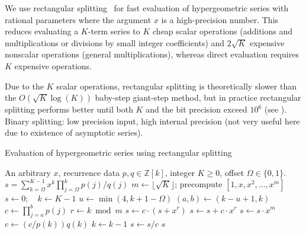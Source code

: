 \documentclass[11pt,a4paper]{article}
\begin{document}
\label{sec:serieseval}

We use rectangular splitting~\cite{Smith1989,Johansson2014rectangular}
for fast evaluation of hypergeometric series with
rational parameters where the argument $x$ is a high-precision number.
This reduces evaluating a $K$-term series to
$K$ cheap scalar operations (additions and multiplications or divisions
by small integer coefficients)
and $2\sqrt{K}$ expensive nonscalar operations (general multiplications),
whereas direct evaluation requires $K$ expensive operations.

Due to the $K$ scalar operations,
rectangular splitting is theoretically slower
than the $O(\sqrt{K} \log(K))$ baby-step giant-step method,
but in practice rectangular splitting
performs better until both $K$ and the bit precision
exceed $10^6$ (see \cite{Johansson2014rectangular}).
Binary splitting: low precision input, high internal precision
(not very useful here due to existence of asymptotic series).

\begin{algorithm}[h!]
  \caption{Evaluation of hypergeometric series using rectangular splitting}
  \small
  \label{alg:hyprs}
  \begin{algorithmic}[1]
    \Require An arbitrary $x$, recurrence data $p, q \in \mathbb{Z}[k]$, integer $K \ge 0$, offset $\Omega \in \{0,1\}$.
    \Ensure $s = \sum_{k=\Omega}^{K-1} x^k \prod_{j=\Omega}^k p(j) / q(j)$
    \State $m \gets \lfloor \sqrt K \rfloor$; precompute $[1, x, x^2, \ldots, x^m]$ 
    \State $s \gets 0; \quad k \gets K - 1$
        \State $u \gets \min(4, k + 1 - \Omega)$  
        \State $(a, b) \gets (k - u + 1, k)$  
        \State $c \gets \prod_{j=a}^b p(j)$ 
            \State $r \gets k \bmod m$
                \State $s \gets c \cdot (s + x^r)$ 
            \Else
                \State $s \gets s + c \cdot x^r$ 
            \EndIf
                \State $s \gets s \cdot x^m$ 
            \EndIf
            \State $c \gets (c / p(k)) q(k)$ 
            \State $k \gets k - 1$
        \EndWhile
        \State $s \gets s / c$
    \EndWhile
    \State \Return $s$
  \end{algorithmic}
\end{algorithm}
\end{document}

